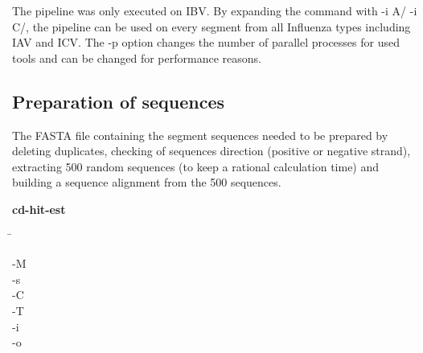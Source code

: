     The pipeline was only executed on \gls{IBV}. By expanding the command with \colorbox{backcolour}{-i A/ -i C/}, the pipeline can be used on every segment from all Influenza types including \gls{IAV} and \gls{ICV}. The \colorbox{backcolour}{-p} option changes the number of parallel processes for used tools and can be changed for performance reasons.
    
\subsection{Preparation of sequences} \label{subsec:2.2.1}

    The FASTA file containing the segment sequences needed to be prepared by deleting duplicates, checking of sequences direction (positive or negative strand), extracting 500 random sequences (to keep a rational calculation time) and building a sequence alignment from the 500 sequences.

    \begin{leftbar}
        \textbf{cd-hit-est}
        \begin{nstabbing}
            \qquad \= \kill
        
            -M \\
        
            -s \\
            
            -C \\
            
            -T \\
        
            -i \\
            
            -o 
        \end{nstabbing}
    \end{leftbar}
    
